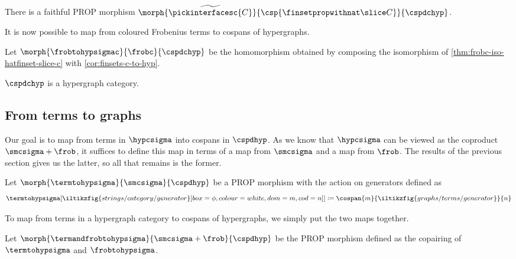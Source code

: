 \begin{corollary}\label{cor:finsets-c-to-hyp}
    There is a faithful PROP morphism \(
    \morph{
        \widetilde{\pickinterfacesc{C}}
    }{
        \csp{\finsetpropwithnat \slice C}
    }{
        \cspdchyp
    }
    \).
\end{corollary}

It is now possible to map from coloured Frobenius terms to cospans of
hypergraphs.

\begin{definition}
    Let \(\morph{\frobtohypsigmac}{\frobc}{\cspdchyp}\) be the homomorphism
    obtained by composing the isomorphism of \cref{thm:frobc-iso-hatfinset-slice-c}
    with \cref{cor:finsets-c-to-hyp}.
\end{definition}

\begin{corollary}
    \(\cspdchyp\) is a hypergraph category.
\end{corollary}

\subsection{From terms to graphs}

Our goal is to map from terms in \(\hypcsigma\) into cospans in \(\cspdhyp\).
As we know that \(\hypcsigma\) can be viewed as the coproduct
\(\smcsigma + \frob\), it suffices to define this map in terms of a map from
\(\smcsigma\) and a map from \(\frob\).
The results of the previous section gives us the latter, so all that remains is
the former.

\begin{definition}\label{def:hyp-morphisms}
    Let \(\morph{\termtohypsigma}{\smcsigma}{\cspdhyp}\) be a PROP
    morphism with the action on generators defined as \[
        \termtohypsigma[\iltikzfig{%
                strings/category/generator%
            }[box=\phi,colour=white,dom=m,cod=n]
        ]
        \coloneqq
        \cospan{m}{\iltikzfig{graphs/terms/generator}}{n}
    \]
\end{definition}

To map from terms in a hypergraph category to cospans of hypergraphs, we simply
put the two maps together.

\begin{definition}
    Let \(
    \morph{\termandfrobtohypsigma}{\smcsigma + \frob}{\cspdhyp}
    \) be the PROP morphism defined as the copairing of \(\termtohypsigma\) and
    \(\frobtohypsigma\).
\end{definition}

